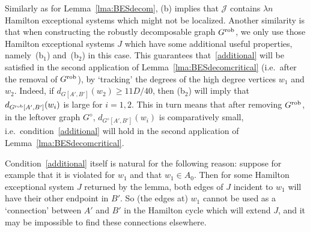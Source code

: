 \documentclass{memo-l}
\def\COMMENT#1{}
\def\eps{\varepsilon}
\def\epszero{\eps_0}
\numberwithin{section}{chapter}
\numberwithin{equation}{section}
\numberwithin{firstthm}{section}
\numberwithin{figure}{section}
\begin{document}
Similarly as for Lemma~\ref{lma:BESdecom}, (b) implies that $\mathcal{J}$ contains $\lambda n$ Hamilton exceptional systems
which might not be localized. Another similarity is that when constructing the robustly decomposable graph $G^{\rm rob}$, 
we only use those Hamilton exceptional systems $J$ which have some additional useful properties, namely~(b$_1$) and~(b$_2$) in this case. 
This guarantees that~\eqref{additional} will be satisfied in the second application of
Lemma~\ref{lma:BESdecomcritical} (i.e.~after the removal of $G^{\rm rob}$), by `tracking' the degrees of the high
degree vertices $w_1$ and $w_2$.
Indeed, if  $d_{G[A',B']}(w_2)\ge 11D/40$, then (b$_2$) will imply that $d_{G^{\rm rob}[A',B']}(w_i)$ is large for $i=1,2$.
This in turn means that after removing $G^{\rm rob}$, in the leftover graph $G^\diamond$, $d_{G^\diamond[A',B']}(w_i)$ is comparatively small, 
i.e.~condition~\eqref{additional} will hold in the  second application  of Lemma~\ref{lma:BESdecomcritical}.%
    \COMMENT{We construct $G^{\text rob}$ as follows.
We pick those $J_s$ satisfying (b$_1$) and (b$_2$) to construct $G^{\text rob}$.
Let $G'' : = G - G_0 - G^{\text rob}$, where $G_0$ is the graph defined by Lemma~\ref{V_0elimination}.
Next, we apply Lemma~\ref{lma:BESdecomcritical} to $G''$ taking $G_0 = G_0 +G^{rob}$ to decompose $(G'')^{\diamond} := G'' - G''[A] -G''[B]$ into exceptional systems for almost decomposition on a different partition $\mathcal{P}'$, which is found by applying Lemma~\ref{lma:partition2} to $G''$. 
Notice that $(G'')^{\diamond}$ is basically the union of $J_s$ that are not used to constructed $G^{\text rob}$.
Since $G^{\text rob}$ contains those $J_s$ satisfying (b$_1$) and (b$_2$), the degree of $w_1$ in $G''[A',B']$ does indeed decrease if it is large, and similarly for $w_2$. 
Hence, (v) is holds for $(G'')^{\diamond}$.
The reason of using a different $\mathcal{P}'$ rather than refinement of $\mathcal{P}$ is because we do not have any control on the structure of $G^{rob}$.
Hence, $( G''[A]+G''[B], \mathcal{P}) $ is $(K, m, \epszero, \eps ')$-scheme, where $\eps'$ is too large.
Moreover, taking refinement of $\mathcal{P}$ does not decrease $\eps'$.
}

Condition~\eqref{additional} itself is natural for the following reason:
suppose for example that it is violated  for $w_1$ and that $w_1 \in A_0$. 
Then for some Hamilton exceptional system $J$ returned by the lemma, both edges of $J$ incident to $w_1$ will
have their other endpoint in $B'$. So (the edges at) $w_1$ cannot be used as a `connection' between $A'$ and $B'$
in the Hamilton cycle which will extend $J$, and it may be impossible to find these connections elsewhere.
\end{document}
